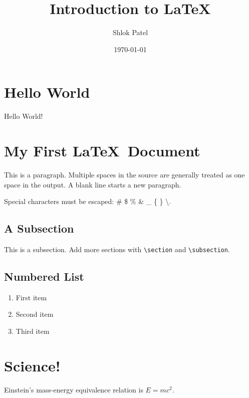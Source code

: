\documentclass[12pt,a4paper]{article}
\title{Introduction to \LaTeX}
\author{Shlok Patel}
\date{\today}
\begin{document}
\maketitle

\section{Hello World}
Hello World!

\section{My First \LaTeX\ Document}
This is a paragraph. Multiple spaces in the source are generally
treated as one space in the output. A blank line starts a new paragraph.

Special characters must be escaped:
\# \quad \$ \quad \% \quad \& \quad \_ \quad
\{ \quad \} \quad \textbackslash.

\subsection{A Subsection}
This is a subsection. Add more sections with \verb|\section|
and \verb|\subsection|.

\subsection{Numbered List}
\begin{enumerate}
    \item First item
    \item Second item
    \item Third item
\end{enumerate}

\clearpage
\tableofcontents
\clearpage

\section{Science!}
Einstein's mass-energy equivalence relation is
\(E=mc^2\).
\end{document}
